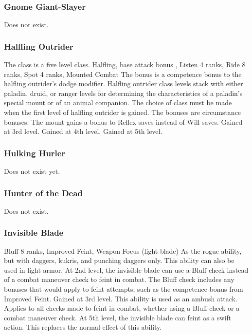 \subsubsection{Gnome Giant-Slayer}
Does not exist.
\subsubsection{Halfling Outrider}
 The class is a five level class.
 Halfling, base attack bonus , Listen 4 ranks, Ride 8 ranks, Spot 4 ranks, Mounted Combat
 The bonus is a competence bonus to the halfling outrider's dodge modifier.
 Halfling outrider class levels stack with either paladin, druid, or ranger levels for determining the characteristics of a paladin's special mount or of an animal companion. The choice of class must be made when the first level of halfling outrider is gained.
 The bonuses are circumstance bonuses. The mount gains a bonus to Reflex saves instead of Will saves.
 Gained at 3rd level.
 Gained at 4th level.
 Gained at 5th level.
\subsubsection{Hulking Hurler}
Does not exist yet.
\subsubsection{Hunter of the Dead}
Does not exist.
\subsubsection{Invisible Blade}
 Bluff 8 ranks, Improved Feint, Weapon Focus (light blade)
 As the rogue ability, but with daggers, kukris, and punching daggers only.
 This ability can also be used in light armor.
 At 2nd level, the invisible blade can use a Bluff check instead of a combat maneuver check to feint in combat. The Bluff check includes any bonuses that would apply to feint attempts, such as the  competence bonus from Improved Feint.
 Gained at 3rd level. This ability is used as an ambush attack.
 Applies to all checks made to feint in combat, whether using a Bluff check or a combat maneuver check.
 At 5th level, the invisible blade can feint as a swift action. This replaces the normal effect of this ability.
